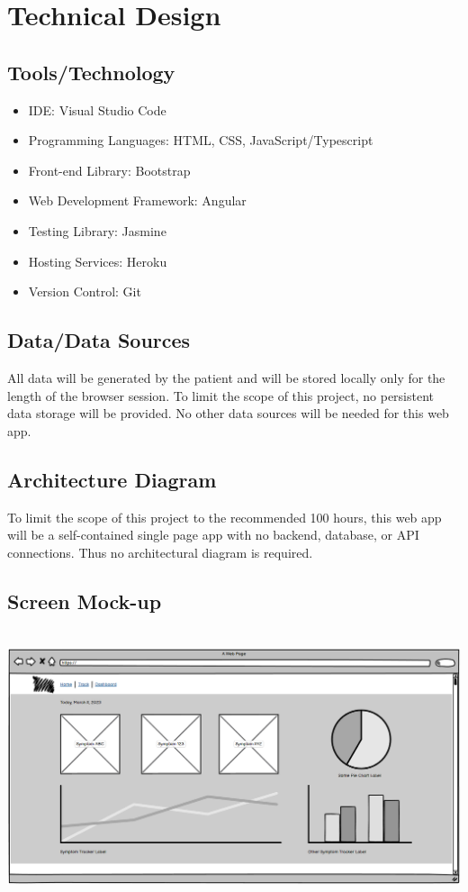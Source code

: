 \documentclass[letterpaper]{jdf}
\begin{document}
\section{Technical Design}
    \subsection{Tools/Technology}
    \begin{itemize}
        \item IDE: Visual Studio Code
        \item Programming Languages: HTML, CSS, JavaScript/Typescript
        \item Front-end Library: Bootstrap
        \item Web Development Framework: Angular
        \item Testing Library: Jasmine
        \item Hosting Services: Heroku
        \item Version Control: Git
    \end{itemize}

    \subsection{Data/Data Sources}
    All data will be generated by the patient and will be stored locally only for the length of the browser session.
    To limit the scope of this project, no persistent data storage will be provided.
    No other data sources will be needed for this web app.

    \subsection{Architecture Diagram}
    To limit the scope of this project to the recommended 100 hours, 
    this web app will be a self-contained single page app with no backend, database, or API connections.
    Thus no architectural diagram is required.

    \subsection{Screen Mock-up}
    \begin{jdffigure}
        \includegraphics[height=8cm]{Figures/Screen Mockup.PNG}
        \label{fig:Mockup}
    \end{jdffigure}
\end{document}

